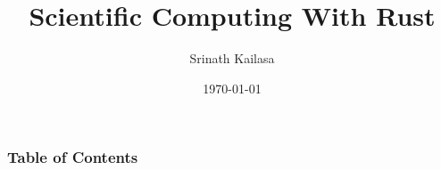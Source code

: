\documentclass{beamer}
\title{Scientific Computing With Rust}
\author{Srinath Kailasa}
\institute{Department of Mathematics\\University College London}
\date{\today}
\begin{document}
\frame{\titlepage}

\begin{frame}
\frametitle{Table of Contents}
\tableofcontents
\end{frame}




\end{document}
